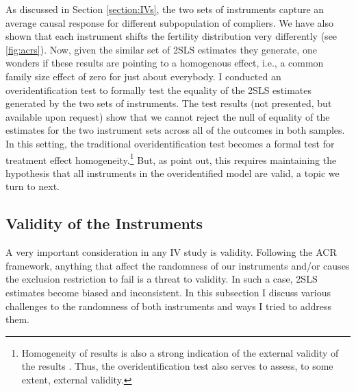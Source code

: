 As discussed in Section \ref{section:IVs}, the two sets of instruments capture an average causal response for different subpopulation of compliers. We have also shown that each instrument shifts the fertility distribution very differently (see \autoref{fig:acrs}). Now, given the similar set of 2SLS estimates they generate, one wonders if these results are pointing to a homogenous effect, i.e., a common family size effect of zero for just about everybody. I conducted an overidentification test to formally test the equality of the 2SLS estimates generated by the two sets of instruments. The test results (not presented, but available upon request) show that we cannot reject the null of equality of the estimates for the two instrument sets across all of the outcomes in both samples. In this setting, the traditional overidentification test becomes a formal test for treatment effect homogeneity.\footnote{ Homogeneity of results is also a strong indication of the external validity of the results \parencite[see][p.~776]{angrist_multiple_2010}. Thus, the overidentification test also serves to assess, to some extent, external validity. } But, as \textcite[p.~167]{Angrist2009} point out, this requires maintaining the hypothesis that all instruments in the overidentified model are valid, a topic we turn to next.


\subsection{Validity of the Instruments}
\label{section:valid}

A very important consideration in any IV study is validity. Following the ACR framework, anything that affect the randomness of our instruments and/or causes the exclusion restriction to fail is a threat to validity. In such a case, 2SLS estimates become biased and inconsistent. In this subsection I discuss various challenges to the randomness of both instruments and ways I tried to address them.

